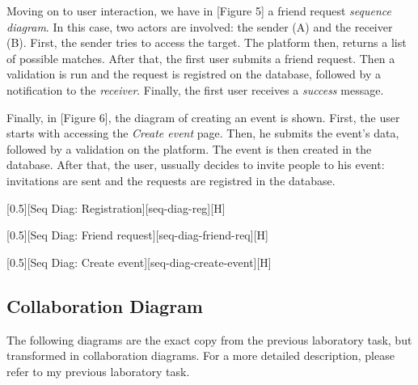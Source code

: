 \documentclass{article}
\begin{document}
			\bigskip
			Moving on to user interaction, we have in [Figure 5] a friend request \textit{sequence diagram}. In this case, two actors are involved: the sender (A) and the receiver (B). First, the sender tries to access the target. The platform then, returns a list of possible matches. After that, the first user submits a friend request. Then a validation is run and the request is registred on the database, followed by a notification to the \textit{receiver}. Finally, the first user receives a \textit{success} message.

			\bigskip
			Finally, in [Figure 6], the diagram of creating an event is shown. First, the user starts with accessing the \textit{Create event} page. Then, he submits the event's data, followed by a validation on the platform. The event is then created in the database. After that, the user, ussually decides to invite people to his event: invitations are sent and the requests are registred in the database.

			[0.5][Seq Diag: Registration][seq-diag-reg][H]
			
			[0.5][Seq Diag: Friend request][seq-diag-friend-req][H]

			[0.5][Seq Diag: Create event][seq-diag-create-event][H]

		\subsection{Collaboration Diagram}
			The following diagrams are the exact copy from the previous laboratory task, but transformed in collaboration diagrams. For a more detailed description, please refer to my previous laboratory task.
\end{document}
